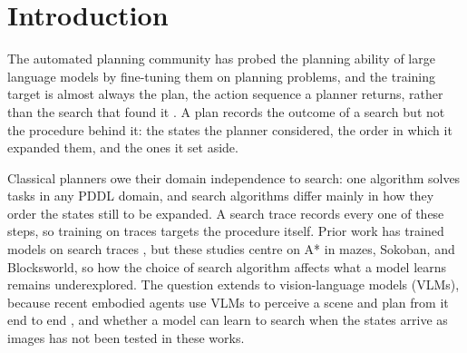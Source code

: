 \section{Introduction}
\label{sec:introduction}

The automated planning community has probed the planning ability of large language models by fine-tuning them on planning problems, and the training target is almost always the plan, the action sequence a planner returns, rather than the search that found it \citep{pallagani2022plansformer,rossetti2024learning,bohnet2024exploring,belcamino2026generalization}.
A plan records the outcome of a search but not the procedure behind it: the states the planner considered, the order in which it expanded them, and the ones it set aside.

Classical planners owe their domain independence to search: one algorithm solves tasks in any PDDL domain, and search algorithms differ mainly in how they order the states still to be expanded.
A search trace records every one of these steps, so training on traces targets the procedure itself.
Prior work has trained models on search traces \citep{lehnert2024beyond,saha2024system1x}, but these studies centre on A* in mazes, Sokoban, and Blocksworld, so how the choice of search algorithm affects what a model learns remains underexplored.
The question extends to vision-language models (VLMs), because recent embodied agents use VLMs to perceive a scene and plan from it end to end \citep{merler2025viplan,xu2025visual,hao2025simulation}, and whether a model can learn to search when the states arrive as images has not been tested in these works.


